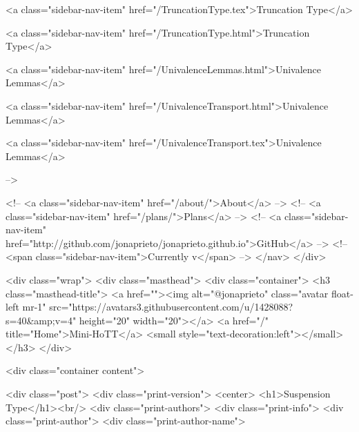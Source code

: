       
    
      
        
          <a class="sidebar-nav-item" href="/TruncationType.tex">Truncation Type</a>
        
      
    
      
        
          <a class="sidebar-nav-item" href="/TruncationType.html">Truncation Type</a>
        
      
    
      
        
          <a class="sidebar-nav-item" href="/UnivalenceLemmas.html">Univalence Lemmas</a>
        
      
    
      
        
          <a class="sidebar-nav-item" href="/UnivalenceTransport.html">Univalence Lemmas</a>
        
      
    
      
        
          <a class="sidebar-nav-item" href="/UnivalenceTransport.tex">Univalence Lemmas</a>
        
      
     -->

    <!-- <a class="sidebar-nav-item" href="/about/">About</a> -->
    <!-- <a class="sidebar-nav-item" href="/plans/">Plans</a> -->
    <!-- <a class="sidebar-nav-item" href="http://github.com/jonaprieto/jonaprieto.github.io">GitHub</a> -->
    <!-- <span class="sidebar-nav-item">Currently v</span> -->
  </nav>
</div>

    <div class="wrap">
      <div class="masthead">
        <div class="container">
          <h3 class="masthead-title">
            <a href=""><img alt="@jonaprieto" class="avatar float-left mr-1" src="https://avatars3.githubusercontent.com/u/1428088?s=40&amp;v=4" height="20" width="20"></a>
            <a href="/" title="Home">Mini-HoTT</a>
            <small style="text-decoration:left"></small>
          </h3>
        </div>
      
      <div class="container content">
        







<div class="post">
  <div class="print-version">
    <center>
      <h1>Suspension Type</h1><br/>
        <div class="print-authors">
          <div class="print-info">
            <div class="print-author">
              <div class="print-author-name">
                
